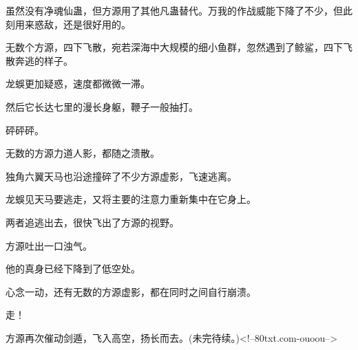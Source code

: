 \begin{this_body}
虽然没有净魂仙蛊，但方源用了其他凡蛊替代。万我的作战威能下降了不少，但此刻用来惑敌，还是很好用的。

无数个方源，四下飞散，宛若深海中大规模的细小鱼群，忽然遇到了鲸鲨，四下飞散奔逃的样子。

龙蜈更加疑惑，速度都微微一滞。

然后它长达七里的漫长身躯，鞭子一般抽打。

砰砰砰。

无数的方源力道人影，都随之溃散。

独角六翼天马也沿途撞碎了不少方源虚影，飞速逃离。

龙蜈见天马要逃走，又将主要的注意力重新集中在它身上。

两者追逃出去，很快飞出了方源的视野。

方源吐出一口浊气。

他的真身已经下降到了低空处。

心念一动，还有无数的方源虚影，都在同时之间自行崩溃。

走！

方源再次催动剑遁，飞入高空，扬长而去。(未完待续。)<!--80txt.com-ouoou-->

\end{this_body}

